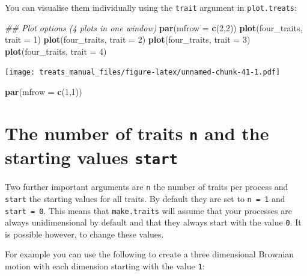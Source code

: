\documentclass[
]{book}
\newenvironment{Shaded}{\begin{snugshade}}{\end{snugshade}}
\newcommand{\CommentTok}[1]{\textcolor[rgb]{0.56,0.35,0.01}{\textit{#1}}}
\newcommand{\DataTypeTok}[1]{\textcolor[rgb]{0.13,0.29,0.53}{#1}}
\newcommand{\DecValTok}[1]{\textcolor[rgb]{0.00,0.00,0.81}{#1}}
\newcommand{\KeywordTok}[1]{\textcolor[rgb]{0.13,0.29,0.53}{\textbf{#1}}}
\newcommand{\NormalTok}[1]{#1}
\begin{document}
You can visualise them individually using the \texttt{trait} argument in \texttt{plot.treats}:

\begin{Shaded}
\begin{Highlighting}[]
\CommentTok{\#\# Plot options (4 plots in one window)}
\KeywordTok{par}\NormalTok{(}\DataTypeTok{mfrow =} \KeywordTok{c}\NormalTok{(}\DecValTok{2}\NormalTok{,}\DecValTok{2}\NormalTok{))}
\KeywordTok{plot}\NormalTok{(four\_traits, }\DataTypeTok{trait =} \DecValTok{1}\NormalTok{)}
\KeywordTok{plot}\NormalTok{(four\_traits, }\DataTypeTok{trait =} \DecValTok{2}\NormalTok{)}
\KeywordTok{plot}\NormalTok{(four\_traits, }\DataTypeTok{trait =} \DecValTok{3}\NormalTok{)}
\KeywordTok{plot}\NormalTok{(four\_traits, }\DataTypeTok{trait =} \DecValTok{4}\NormalTok{)}
\end{Highlighting}
\end{Shaded}

\texttt{[image: treats\_manual\_files/figure-latex/unnamed-chunk-41-1.pdf]}

\begin{Shaded}
\begin{Highlighting}[]
\KeywordTok{par}\NormalTok{(}\DataTypeTok{mfrow =} \KeywordTok{c}\NormalTok{(}\DecValTok{1}\NormalTok{,}\DecValTok{1}\NormalTok{))}
\end{Highlighting}
\end{Shaded}

\hypertarget{the-number-of-traits-n-and-the-starting-values-start}{%
\section{\texorpdfstring{The number of traits \texttt{n} and the starting values \texttt{start}}{The number of traits n and the starting values start}}\label{the-number-of-traits-n-and-the-starting-values-start}}

Two further important arguments are \texttt{n} the number of traits per process and \texttt{start} the starting values for all traits.
By default they are set to \texttt{n\ =\ 1} and \texttt{start\ =\ 0}.
This means that \texttt{make.traits} will assume that your processes are always unidimensional by default and that they always start with the value \texttt{0}.
It is possible however, to change these values.

For example you can use the following to create a three dimensional Brownian motion with each dimension starting with the value \texttt{1}:
\end{document}
